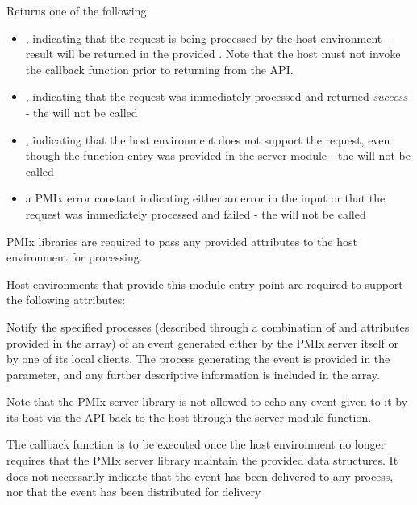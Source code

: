 Returns one of the following:

\begin{itemize}
    \item {}, indicating that the request is being processed by the host environment - result will be returned in the provided . Note that the host must not invoke the callback function prior to returning from the \ac{API}.
    \item {}, indicating that the request was immediately processed and returned \textit{success} - the  will not be called
    \item {}, indicating that the host environment does not support the request, even though the function entry was provided in the server module - the  will not be called
    \item a PMIx error constant indicating either an error in the input or that the request was immediately processed and failed - the  will not be called
\end{itemize}

\reqattrstart
\ac{PMIx} libraries are required to pass any provided attributes to the host environment for processing.

\divider

Host environments that provide this module entry point are required to support the following attributes:


\reqattrend

\descr

Notify the specified processes (described through a combination of  and attributes provided in the  array) of an event generated either by the \ac{PMIx} server itself or by one of its local clients.
The process generating the event is provided in the  parameter, and any further descriptive information is
included in the  array.

Note that the \ac{PMIx} server library is not allowed to echo any event given to it by its host via the  \ac{API} back to the host through the  server module function.

\advicermstart
The callback function is to be executed once the host environment no longer requires that the \ac{PMIx} server library maintain the provided data structures. It does not necessarily indicate that the event has been delivered to any process, nor that the event has been distributed for delivery
\advicermend


